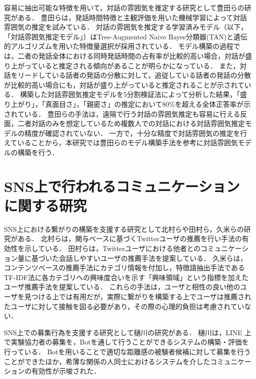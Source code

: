 容易に抽出可能な特徴を用いて，対話の雰囲気を推定する研究として豊田ら\cite{Toyota}の研究がある．
豊田らは，発話時間特徴と主観評価を用いた機械学習によって対話雰囲気の推定を試みている．
対話の雰囲気を推定する学習済みモデル（以下，「対話雰囲気推定モデル」）はTree-Augmented Naive Bayes分類器(TAN)と遺伝的アルゴリズムを用いた特徴量選択が採用されている．
モデル構築の過程では，二者の発話全体における同時発話時間の占有率が比較的高い場合，対話が盛り上がっていると推定される傾向があることが明らかになっている．
また，対話をリードしている話者の発話の分散に対して，追従している話者の発話の分散が比較的高い場合にも，対話が盛り上がっていると推定されることが示されている．
構築した対話雰囲気推定モデルを5分割検証法によって分析した結果，「盛り上がり」，「真面目さ」，「親密さ」の推定において80\%を超える全体正答率が示されている．
豊田らの手法は，遠隔で行う対話の雰囲気推定も容易に行える反面，二者対話のみを想定しているため複数人での対話における対話雰囲気推定モデルの精度が確認されていない．
一方で，十分な精度で対話雰囲気の推定を行えていることから，本研究では豊田らのモデル構築手法を参考に対話雰囲気モデルの構築を行う．

\section{SNS上で行われるコミュニケーションに関する研究}

SNS上における繋がりの構築を支援する研究として北村ら\cite{Kitamura}や田村ら\cite{Tamura}，久米ら\cite{Kume}の研究がある．
北村らは，関与ベースに基づくTwitterユーザの推薦を行い手法の有効性を示している．
田村らは，Twitterユーザにおける他者とのコミュニケーション量に基づいた会話しやすいユーザの推薦手法を提案している．
久米らは，コンテンツベースの推薦手法にカテゴリ情報を付加し，特徴語抽出手法であるTF-IDF法に各カテゴリへの興味度合いを示す「興味領域」という指標を加えたユーザ推薦手法を提案している．
これらの手法は，ユーザと相性の良い他のユーザを見つける上では有用だが，実際に繋がりを構築する上でユーザは推薦されたユーザに対して接触を図る必要があり，その際の心理的負担は考慮されていない．

SNS上での募集行為を支援する研究として樋川\cite{Hikawa}の研究がある．
樋川は，LINE \cite{LINE}上で実験協力者の募集を，Botを通して行うことができるシステムの構築・評価を行っている．
Botを用いることで適切な距離感の被験者候補に対して募集を行うことができたほか，希薄な関係の人同士におけるシステムを介したコミュニケーションの有効性が示唆された．
